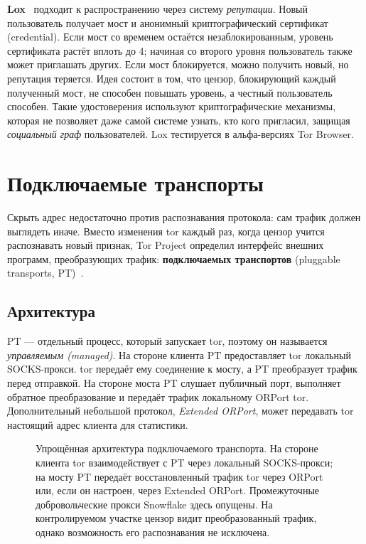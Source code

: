\textbf{Lox}~\cite{tulloch2023lox} подходит к распространению через систему \emph{репутации}. Новый пользователь получает мост и анонимный криптографический сертификат (credential). Если мост со временем остаётся незаблокированным, уровень сертификата растёт вплоть до 4; начиная со второго уровня пользователь также может приглашать других. Если мост блокируется, можно получить новый, но репутация теряется. Идея состоит в том, что цензор, блокирующий каждый полученный мост, не способен повышать уровень, а честный пользователь способен. Такие удостоверения используют криптографические механизмы, которая не позволяет даже самой системе узнать, кто кого пригласил, защищая \emph{социальный граф} пользователей. Lox тестируется в альфа-версиях Tor Browser.

\section{Подключаемые транспорты}\label{sec:cens-pt}

Скрыть адрес недостаточно против распознавания протокола: сам трафик должен выглядеть иначе. Вместо изменения tor каждый раз, когда цензор учится распознавать новый признак, Tor Project определил интерфейс внешних программ, преобразующих трафик: \textbf{подключаемых транспортов} (pluggable transports, PT)~.

\subsection{Архитектура}

PT --- отдельный процесс, который запускает tor, поэтому он называется \emph{управляемым (managed)}. На стороне клиента PT предоставляет tor локальный SOCKS-прокси. tor передаёт ему соединение к мосту, а PT преобразует трафик перед отправкой. На стороне моста PT слушает публичный порт, выполняет обратное преобразование и передаёт трафик локальному ORPort tor. Дополнительный небольшой протокол, \emph{Extended ORPort}, может передавать tor настоящий адрес клиента для статистики.

\begin{figure}[htbp]
\centering

\caption{Упрощённая архитектура подключаемого транспорта. На стороне клиента tor взаимодействует с PT через локальный SOCKS-прокси; на мосту PT передаёт восстановленный трафик tor через ORPort или, если он настроен, через Extended ORPort. Промежуточные добровольческие прокси Snowflake здесь опущены. На контролируемом участке цензор видит преобразованный трафик, однако возможность его распознавания не исключена.}
\label{fig:pt}
\end{figure}


